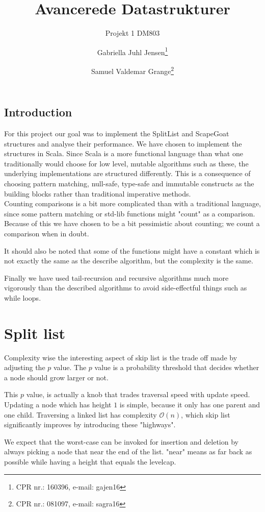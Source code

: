 \documentclass[oneside]{scrbook}
\title{Avancerede Datastrukturer}
\subtitle{Projekt 1 DM803}
\author{Gabriella Juhl Jensen\thanks{CPR nr.: 160396, e-mail: gajen16} \and Samuel Valdemar Grange\thanks{CPR nr.: 081097, e-mail: sagra16} }
\begin{document}
\maketitle
\section*{Introduction}
For this project our goal was to implement the SplitList and ScapeGoat structures and analyse their performance.
We have chosen to implement the structures in Scala.
Since Scala is a more functional language than what one traditionally would choose for low level, mutable algorithms such as these,
the underlying implementations are structured differently.
This is a consequence of choosing pattern matching, null-safe, type-safe and immutable constructs as the building blocks rather than traditional imperative methods.
\\

Counting comparisons is a bit more complicated than with a traditional language, since some pattern matching or std-lib functions might "count" as a comparison.
Because of this we have chosen to be a bit pessimistic about counting;
we count a comparison when in doubt.

It should also be noted that some of the functions might have a constant which is not exactly the same as the describe algorithm, but the complexity is the same.

Finally we have used tail-recursion and recursive algorithms much more vigorously than the described algorithms to avoid side-effectful things such as while loops.

\chapter{Split list}
Complexity wise the interesting aspect of skip list is the trade off made by adjusting the $p$ value.
The $p$ value is a probability threshold that decides whether a node should grow larger or not.

This $p$ value, is actually a knob that trades traversal speed with update speed.
Updating a node which has height $1$ is simple, because it only has one parent and one child.
Traversing a linked list has complexity $\mathcal{O}(n)$, which skip list significantly improves by introducing these "highways".

We expect that the worst-case can be invoked for insertion and deletion by always picking a node that near the end of the list.
"near" means as far back as possible while having a height that equals the levelcap.
\end{document}

